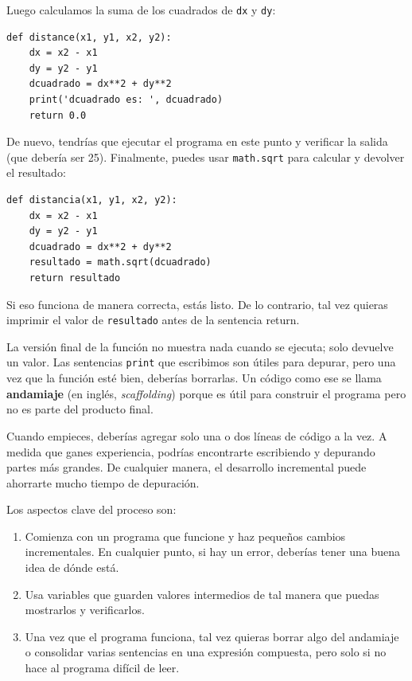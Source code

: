 \documentclass[10pt]{book}
\begin{document}
Luego calculamos la suma de los cuadrados de {\tt dx} y {\tt dy}:

\begin{verbatim}
def distance(x1, y1, x2, y2):
    dx = x2 - x1
    dy = y2 - y1
    dcuadrado = dx**2 + dy**2
    print('dcuadrado es: ', dcuadrado)
    return 0.0
\end{verbatim}
%
De nuevo, tendrías que ejecutar el programa en este punto y verificar la salida
(que debería ser 25).
Finalmente, puedes usar {\tt math.sqrt} para calcular y devolver el resultado:

\begin{verbatim}
def distancia(x1, y1, x2, y2):
    dx = x2 - x1
    dy = y2 - y1
    dcuadrado = dx**2 + dy**2
    resultado = math.sqrt(dcuadrado)
    return resultado
\end{verbatim}
%
Si eso funciona de manera correcta, estás listo.  De lo contrario, tal vez
quieras imprimir el valor de {\tt resultado} antes de la sentencia
return.

La versión final de la función no muestra nada cuando se
ejecuta; solo devuelve un valor.  Las sentencias {\tt print} que escribimos
son útiles para depurar, pero una vez que la función esté bien, deberías
borrarlas.  Un código como ese se llama {\bf andamiaje} (en inglés, {\em scaffolding})
porque es útil para construir el programa pero no es parte del
producto final.

Cuando empieces, deberías agregar solo una o dos líneas de código a la
vez.  A medida que ganes experiencia, podrías encontrarte escribiendo
y depurando partes más grandes.  De cualquier manera, el desarrollo incremental
puede ahorrarte mucho tiempo de depuración.

Los aspectos clave del proceso son:

\begin{enumerate}

\item Comienza con un programa que funcione y haz pequeños cambios incrementales.
En cualquier punto, si hay un error, deberías tener una buena idea de
dónde está.

\item Usa variables que guarden valores intermedios de tal manera que puedas
mostrarlos y verificarlos.

\item Una vez que el programa funciona, tal vez quieras borrar algo del
andamiaje o consolidar varias sentencias en una expresión
compuesta, pero solo si no hace al programa difícil de
leer.

\end{enumerate}
\end{document}
